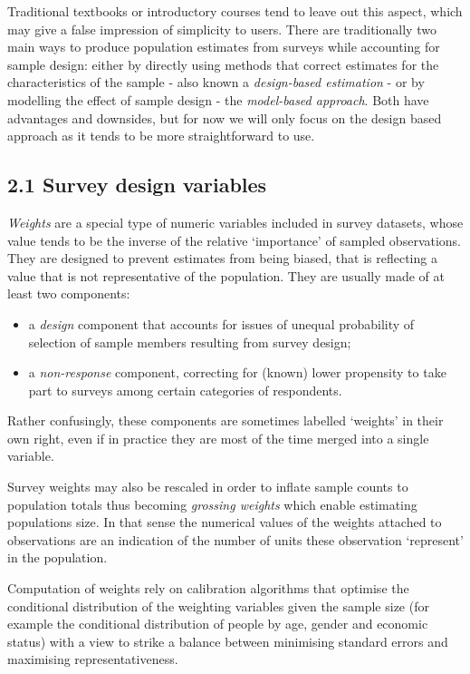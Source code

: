 \documentclass[
  14,
  a4paper,
  DIV=11,
  numbers=noendperiod]{scrartcl}
\begin{document}
Traditional textbooks or introductory courses tend to leave out this
aspect, which may give a false impression of simplicity to users. There
are traditionally two main ways to produce population estimates from
surveys while accounting for sample design: either by directly using
methods that correct estimates for the characteristics of the sample -
also known a \emph{design-based estimation} - or by modelling the effect
of sample design - the \emph{model-based approach}. Both have advantages
and downsides, but for now we will only focus on the design based
approach as it tends to be more straightforward to use.

\hypertarget{survey-design-variables}{%
\subsection{2.1 Survey design variables}\label{survey-design-variables}}

\emph{Weights} are a special type of numeric variables included in
survey datasets, whose value tends to be the inverse of the relative
`importance' of sampled observations. They are designed to prevent
estimates from being biased, that is reflecting a value that is not
representative of the population. They are usually made of at least two
components:

\begin{itemize}
\item
  a \emph{design} component that accounts for issues of unequal
  probability of selection of sample members resulting from survey
  design;
\item
  a \emph{non-response} component, correcting for (known) lower
  propensity to take part to surveys among certain categories of
  respondents.
\end{itemize}

Rather confusingly, these components are sometimes labelled `weights' in
their own right, even if in practice they are most of the time merged
into a single variable.

Survey weights may also be rescaled in order to inflate sample counts to
population totals thus becoming \emph{grossing weights} which enable
estimating populations size. In that sense the numerical values of the
weights attached to observations are an indication of the number of
units these observation `represent' in the population.

Computation of weights rely on calibration algorithms that optimise the
conditional distribution of the weighting variables given the sample
size (for example the conditional distribution of people by age, gender
and economic status) with a view to strike a balance between minimising
standard errors and maximising representativeness.
\end{document}
